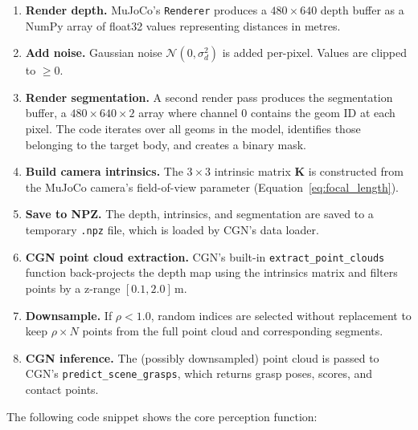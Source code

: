 \documentclass[11pt,a4paper]{report}
\begin{document}
\begin{enumerate}
  \item \textbf{Render depth.} MuJoCo's \texttt{Renderer} produces a $480 \times 640$ depth buffer as a NumPy array of float32 values representing distances in metres.

  \item \textbf{Add noise.} Gaussian noise $\mathcal{N}(0, \sigma_d^2)$ is added per-pixel. Values are clipped to $\geq 0$.

  \item \textbf{Render segmentation.} A second render pass produces the segmentation buffer, a $480 \times 640 \times 2$ array where channel 0 contains the geom ID at each pixel. The code iterates over all geoms in the model, identifies those belonging to the target body, and creates a binary mask.

  \item \textbf{Build camera intrinsics.} The $3 \times 3$ intrinsic matrix $\mathbf{K}$ is constructed from the MuJoCo camera's field-of-view parameter (Equation~\ref{eq:focal_length}).

  \item \textbf{Save to NPZ.} The depth, intrinsics, and segmentation are saved to a temporary \texttt{.npz} file, which is loaded by CGN's data loader.

  \item \textbf{CGN point cloud extraction.} CGN's built-in \texttt{extract\_point\_clouds} function back-projects the depth map using the intrinsics matrix and filters points by a z-range $[0.1, 2.0]$\,m.

  \item \textbf{Downsample.} If $\rho < 1.0$, random indices are selected without replacement to keep $\rho \times N$ points from the full point cloud and corresponding segments.

  \item \textbf{CGN inference.} The (possibly downsampled) point cloud is passed to CGN's \texttt{predict\_scene\_grasps}, which returns grasp poses, scores, and contact points.
\end{enumerate}

The following code snippet shows the core perception function:
\end{document}
